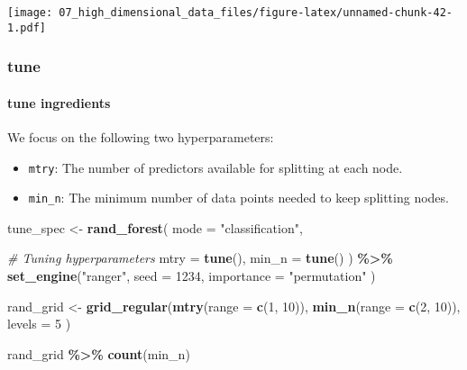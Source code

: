 \documentclass[
]{book}
\newenvironment{Shaded}{\begin{snugshade}}{\end{snugshade}}
\newcommand{\CommentTok}[1]{\textcolor[rgb]{0.56,0.35,0.01}{\textit{#1}}}
\newcommand{\DataTypeTok}[1]{\textcolor[rgb]{0.13,0.29,0.53}{#1}}
\newcommand{\DecValTok}[1]{\textcolor[rgb]{0.00,0.00,0.81}{#1}}
\newcommand{\KeywordTok}[1]{\textcolor[rgb]{0.13,0.29,0.53}{\textbf{#1}}}
\newcommand{\NormalTok}[1]{#1}
\newcommand{\OperatorTok}[1]{\textcolor[rgb]{0.81,0.36,0.00}{\textbf{#1}}}
\newcommand{\StringTok}[1]{\textcolor[rgb]{0.31,0.60,0.02}{#1}}
\begin{document}
\texttt{[image: 07\_high\_dimensional\_data\_files/figure-latex/unnamed-chunk-42-1.pdf]}

\hypertarget{tune-2}{%
\subsubsection{tune}\label{tune-2}}

\hypertarget{tune-ingredients-2}{%
\paragraph{tune ingredients}\label{tune-ingredients-2}}

We focus on the following two hyperparameters:

\begin{itemize}
\item
  \texttt{mtry}: The number of predictors available for splitting at each node.
\item
  \texttt{min\_n}: The minimum number of data points needed to keep splitting nodes.
\end{itemize}

\begin{Shaded}
\begin{Highlighting}[]
\NormalTok{tune\_spec \textless{}{-}}
\StringTok{  }\KeywordTok{rand\_forest}\NormalTok{(}
    \DataTypeTok{mode =} \StringTok{"classification"}\NormalTok{,}

    \CommentTok{\# Tuning hyperparameters}
    \DataTypeTok{mtry =} \KeywordTok{tune}\NormalTok{(),}
    \DataTypeTok{min\_n =} \KeywordTok{tune}\NormalTok{()}
\NormalTok{  ) }\OperatorTok{\%\textgreater{}\%}
\StringTok{  }\KeywordTok{set\_engine}\NormalTok{(}\StringTok{"ranger"}\NormalTok{,}
    \DataTypeTok{seed =} \DecValTok{1234}\NormalTok{,}
    \DataTypeTok{importance =} \StringTok{"permutation"}
\NormalTok{  )}

\NormalTok{rand\_grid \textless{}{-}}\StringTok{ }\KeywordTok{grid\_regular}\NormalTok{(}\KeywordTok{mtry}\NormalTok{(}\DataTypeTok{range =} \KeywordTok{c}\NormalTok{(}\DecValTok{1}\NormalTok{, }\DecValTok{10}\NormalTok{)),}
  \KeywordTok{min\_n}\NormalTok{(}\DataTypeTok{range =} \KeywordTok{c}\NormalTok{(}\DecValTok{2}\NormalTok{, }\DecValTok{10}\NormalTok{)),}
  \DataTypeTok{levels =} \DecValTok{5}
\NormalTok{)}

\NormalTok{rand\_grid }\OperatorTok{\%\textgreater{}\%}
\StringTok{  }\KeywordTok{count}\NormalTok{(min\_n)}
\end{Highlighting}
\end{Shaded}
\end{document}
